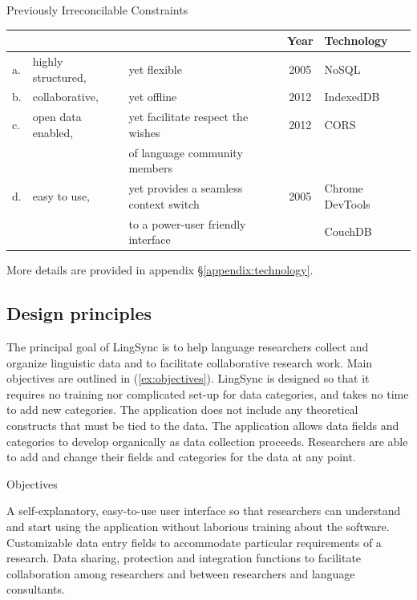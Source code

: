 \documentclass[letterpaper, 12pt, dvips]{mitwpl}
\begin{document}
\begin{exe}
\ex  Previously Irreconcilable Constraints

\begin{tabular}{lllcl}
&& & Year & Technology \\\hline\hline
a. & highly structured, & yet flexible & 2005 & NoSQL\\\hline
b. & collaborative, & yet offline  & 2012 &  IndexedDB\\\hline
c. & open data enabled,  &yet facilitate respect the wishes  & 2012 & CORS \\
&&  of language community members \\\hline
d. & easy to use,  &yet provides a seamless context switch  & 2005 & Chrome DevTools  \\
&& to a power-user friendly interface && CouchDB
\end{tabular}
\label{ex:Irreconcilable}
\end{exe}


More  details are provided in  appendix \S \ref{appendix:technology}.

\subsection{Design principles} 
\label{sec:design}

The principal goal of LingSync is to help language researchers collect and organize linguistic data and to facilitate collaborative research work. Main objectives are outlined in (\ref{ex:objectives}). 
LingSync is designed so that it requires no training nor complicated set-up for data categories, and takes no time to add new categories.  The application does not include any theoretical constructs that must be tied to the data.  The application allows data fields and categories to develop organically as data collection proceeds. Researchers are able to add and change their fields and categories for the data at any point. 




\begin{exe} 
\ex Objectives

\begin{xlist}
        \ex  A self-explanatory, easy-to-use user interface so that researchers can understand and start using the application without laborious training about the software.
        \ex Customizable data entry fields to accommodate particular requirements of a research.  
        \ex  Data sharing, protection and integration functions to facilitate collaboration among researchers and between researchers and language consultants. 
    \end{xlist}
\label{ex:objectives}
\end{exe}
\end{document}
